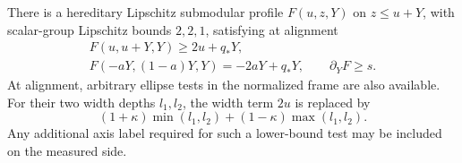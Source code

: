 \begin{proposition}\label{ent:stationary-profile}
There is a hereditary Lipschitz submodular profile $F(u,z,Y)$ on
$z\leq u+Y$, with scalar-group Lipschitz bounds $2,2,1$, satisfying
at alignment
\begin{equation}\label{eq:source-13}
\begin{gathered}
F(u,u+Y,Y)\geq2u+q_*Y,\\
F(-aY,(1-a)Y,Y)=-2aY+q_*Y,\qquad \partial_YF\geq s.
\end{gathered}
\end{equation}
At alignment, arbitrary ellipse tests in the normalized frame are
also available.  For their two width depths $l_1,l_2$, the width
term $2u$ is replaced by
\[
(1+\kappa)\min(l_1,l_2)+(1-\kappa)\max(l_1,l_2).
\]
Any additional axis label required for such a lower-bound test may
be included on the measured side.
\end{proposition}

